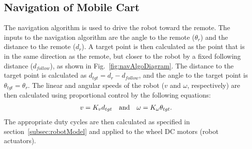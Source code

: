 \documentclass[conference]{IEEEtran}
\begin{document}
\subsection{Navigation of Mobile Cart}\label{subsec:navAlgo}
The navigation algorithm is used to drive the robot toward the remote. The inputs to the navigation algorithm are the angle to the remote ($\theta_r$) and the distance to the remote ($d_r$). A target point is then calculated as the point that is in the same direction as the remote, but closer to the robot by a fixed following distance ($d_{follow}$), as shown in Fig.~\ref{fig:navAlgoDiagram}. The distance to the target point is calculated as $d_{tgt} = d_r - d_{follow}$, and the angle to the target point is $\theta_{tgt} = \theta_r$. The linear and angular speeds of the robot ($v$ and $\omega$, respectively) are then calculated using proportional control by the following equations: %
%
\begin{align*}
  v = K_vd_{tgt}\qq{and}\omega = K_\omega\theta_{tgt}.
\end{align*}
%
The appropriate duty cycles are then calculated as specified in section~\ref{subsec:robotModel} and applied to the wheel DC motors (robot actuators). %
%
\end{document}
